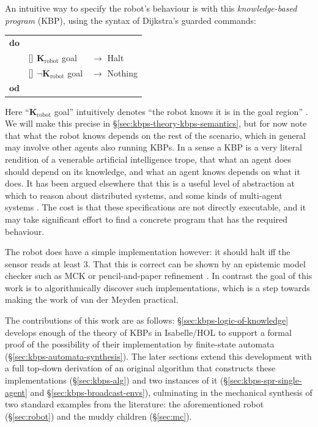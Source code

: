 \documentclass{article}
\begin{document}
An intuitive way to specify the robot's behaviour is with this
\emph{knowledge-based program} (KBP), using the syntax of Dijkstra's
guarded commands:
\begin{center}
  \begin{tabular}{lll}
    $\mathbf{do}$\\
     & $\mathbin{[]}$ $\mathbf{K}_{\mbox{robot}}$ goal & $\rightarrow$ Halt\\
     & $\mathbin{[]}$ $\lnot\mathbf{K}_{\mbox{robot}}$ goal & $\rightarrow$ Nothing\\
    $\mathbf{od}$\\
  \end{tabular}
\end{center}
Here ``$\mathbf{K}_{\mbox{robot}}$ goal'' intuitively denotes ``the
robot knows it is in the goal region''
\cite[Example~7.2.2]{FHMV:1995}. We will make this precise in
\S\ref{sec:kbps-theory-kbps-semantics}, but for now note that what the
robot knows depends on the rest of the scenario, which in general may
involve other agents also running KBPs. In a sense a KBP is a very
literal rendition of a venerable artificial intelligence trope, that
what an agent does should depend on its knowledge, and what an agent
knows depends on what it does. It has been argued elsewhere
\cite{DBLP:conf/lpar/BickfordCHP04,EvdMM2000:FOSSACS,FHMV:1995} that
this is a useful level of abstraction at which to reason about
distributed systems, and some kinds of multi-agent systems
\cite{Shoham:2008}. The cost is that these specifications are not
directly executable, and it may take significant effort to find a
concrete program that has the required behaviour.

The robot does have a simple implementation however: it should halt
iff the sensor reads at least 3. That this is correct can be shown by
an epistemic model checker such as MCK \cite{DBLP:conf/cav/GammieM04}
or pencil-and-paper refinement \cite{EvdMM2000:FOSSACS}. In contrast
the goal of this work is to algorithmically discover such
implementations, which is a step towards making the work of van der
Meyden \cite{Ron:1996} practical.

The contributions of this work are as follows:
\S\ref{sec:kbps-logic-of-knowledge} develops enough of the theory of
KBPs in Isabelle/HOL \cite{Nipkow-Paulson-Wenzel:2002} to support a
formal proof of the possibility of their implementation by
finite-state automata (\S\ref{sec:kbps-automata-synthesis}). The later
sections extend this development with a full top-down derivation of an
original algorithm that constructs these implementations
(\S\ref{sec:kbps-alg}) and two instances of it
(\S\ref{sec:kbps-spr-single-agent} and
\S\ref{sec:kbps-broadcast-envs}), culminating in the mechanical
synthesis of two standard examples from the literature: the
aforementioned robot (\S\ref{sec:robot}) and the muddy children
(\S\ref{sec:mc}).
\end{document}

